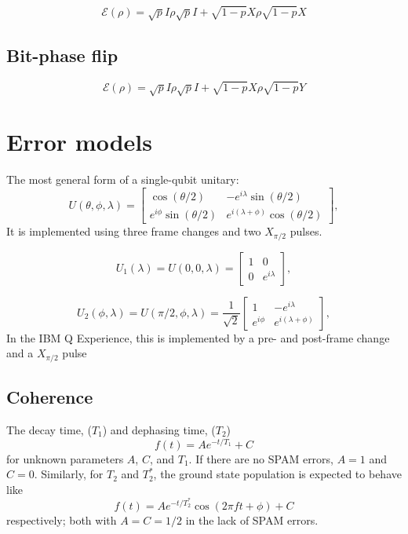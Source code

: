 \documentclass[11pt, oneside]{article}   	%
\begin{document}
\begin{equation}
\mathcal{E} (\rho) = \sqrt{p} I \rho  \sqrt{p} I + \sqrt{1-p} X  \rho \sqrt{1-p} X 
\end{equation}

\subsection{Bit-phase flip}
\begin{equation}
\mathcal{E} (\rho) = \sqrt{p} I \rho  \sqrt{p} I + \sqrt{1-p} X  \rho \sqrt{1-p} Y
\end{equation}

\section{Error models}
The most general form of a single-qubit unitary:
\begin{equation}
U (\theta, \phi, \lambda) = 
\begin{bmatrix}
\cos (\theta/2) & - e^{i \lambda} \sin (\theta/2) \\
e^{i \phi} \sin (\theta/2) & e^{i (\lambda + \phi)} \cos (\theta/2)
\end{bmatrix}, 
\end{equation}
It is implemented using three frame changes and two $X_{\pi/2}$ pulses. 

\begin{equation}
U_1(\lambda) = U (0, 0, \lambda) = 
\begin{bmatrix}
1 & 0 \\
0 & e^{i \lambda}
\end{bmatrix}, 
\end{equation}

\begin{equation}
U_2 (\phi, \lambda) = U (\pi/2, \phi, \lambda) = \frac{1}{\sqrt{2}}
\begin{bmatrix}
1 & - e^{i \lambda} \\
e^{i \phi} & e^{i (\lambda + \phi)}
\end{bmatrix}, 
\end{equation}
 In the IBM Q Experience, this is implemented by a pre- and post-frame change and a $X_{\pi/2}$ pulse

\subsection{Coherence}
The decay time,  ($T_1$) and dephasing time,  ($T_2$) 
\begin{equation}
f(t) = A e^{- t/T_1} + C
\end{equation}
for unknown parameters $A$, $C$, and $T_1$. 
If there are no SPAM errors,  $A = 1$ and $C = 0$.
Similarly, for $T_2$ and $T^*_2$,  the ground state population is expected to behave like
\begin{equation}
f(t) = A e^{- t/T^*_2} \cos( 2\pi f t + \phi ) + C
\end{equation}
respectively; both with $A = C = 1/2$ in the lack of SPAM errors.
\end{document}
